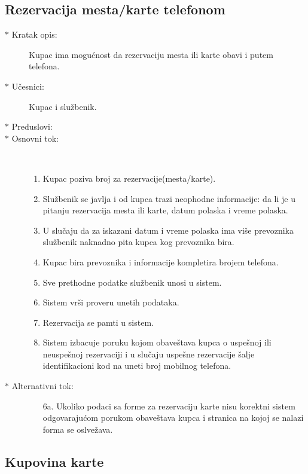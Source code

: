 \subsection{Rezervacija mesta/karte telefonom}
\begin{description}
	\item [$\ast$ Kratak opis: ] Kupac ima mogu\' cnost da rezervaciju mesta ili karte obavi i putem telefona.
	\item[$\ast$ U\v cesnici: ] Kupac i slu\v zbenik.
	\item[$\ast$ Preduslovi: ]
	\item[$\ast$ Osnovni tok: ] \ \\
	\renewcommand{\labelenumii}{\Roman{enumii}}
	\begin{enumerate}
		\item Kupac poziva broj za rezervacije(mesta/karte).
		\item Slu\v zbenik se javlja i od kupca trazi neophodne informacije: da li je u pitanju rezervacija mesta ili karte, datum polaska i vreme polaska.
		\item U slu\v caju da za iskazani datum i vreme polaska ima vi\v se prevoznika slu\v zbenik naknadno pita kupca kog prevoznika bira.
		\item Kupac bira prevoznika i informacije kompletira brojem telefona.
		\item Sve prethodne podatke slu\v zbenik unosi u sistem.
		\item Sistem vr\v si proveru unetih podataka.
		\item Rezervacija se pamti u sistem.
		\item Sistem izbacuje poruku kojom obave\v stava kupca o uspe\v snoj ili neuspe\v snoj rezervaciji i u slu\v caju uspe\v sne rezervacije \v salje identifikacioni kod na uneti broj mobilnog telefona.		
	\end{enumerate}
	\item[$\ast$ Alternativni tok: ]
	\begin{enumerate}
		\item[6a. ] Ukoliko podaci sa forme za rezervaciju karte nisu korektni sistem odgovaraju\' com porukom obave\v stava kupca i stranica na kojoj se nalazi forma se oslve\v zava.
	\end{enumerate}
\end{description}	
\newpage
\subsection{Kupovina karte}
